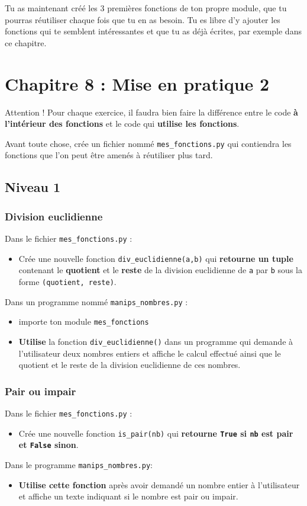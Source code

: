 \documentclass[11pt]{article}
\begin{document}
Tu as maintenant créé les 3 premières fonctions de ton propre module, que tu pourras réutiliser chaque fois que tu en as besoin. Tu es libre d'y ajouter les fonctions qui te semblent intéressantes et que tu as déjà écrites, par exemple dans ce chapitre.

\section*{Chapitre 8 : Mise en pratique 2}
\label{chapitre8}
Attention ! Pour chaque exercice, il faudra bien faire la différence entre le code \textbf{à l'intérieur des fonctions} et le code qui \textbf{utilise les fonctions}.

Avant toute chose, crée un fichier nommé \texttt{mes\_fonctions.py} qui contiendra les fonctions que l'on peut être amenés à réutiliser plus tard.

\subsection*{Niveau 1}
\label{chapitre8_niv1}
\subsubsection*{Division euclidienne}
\label{sec:orge9177a3}
Dans le fichier \texttt{mes\_fonctions.py} :
\begin{itemize}
\item Crée une nouvelle fonction \texttt{div\_euclidienne(a,b)} qui \textbf{retourne un tuple} contenant le \textbf{quotient} et le \textbf{reste} de la division euclidienne de \texttt{a} par \texttt{b} sous la forme \texttt{(quotient, reste)}.
\end{itemize}
Dans un programme nommé \texttt{manips\_nombres.py} :
\begin{itemize}
\item importe ton module \texttt{mes\_fonctions}
\item \textbf{Utilise} la fonction \texttt{div\_euclidienne()} dans un programme qui demande à l'utilisateur deux nombres entiers et affiche le calcul effectué ainsi que le quotient et le reste de la division euclidienne de ces nombres.
\end{itemize}

\subsubsection*{Pair ou impair}
\label{sec:orgd9b231b}
Dans le fichier \texttt{mes\_fonctions.py} :
\begin{itemize}
\item Crée une nouvelle fonction \texttt{is\_pair(nb)} qui \textbf{retourne \texttt{True} si \texttt{nb} est pair et \texttt{False} sinon}.
\end{itemize}
Dans le programme \texttt{manips\_nombres.py}:
\begin{itemize}
\item \textbf{Utilise cette fonction} après avoir demandé un nombre entier à l'utilisateur et affiche un texte indiquant si le nombre est pair ou impair.
\end{itemize}
\end{document}
